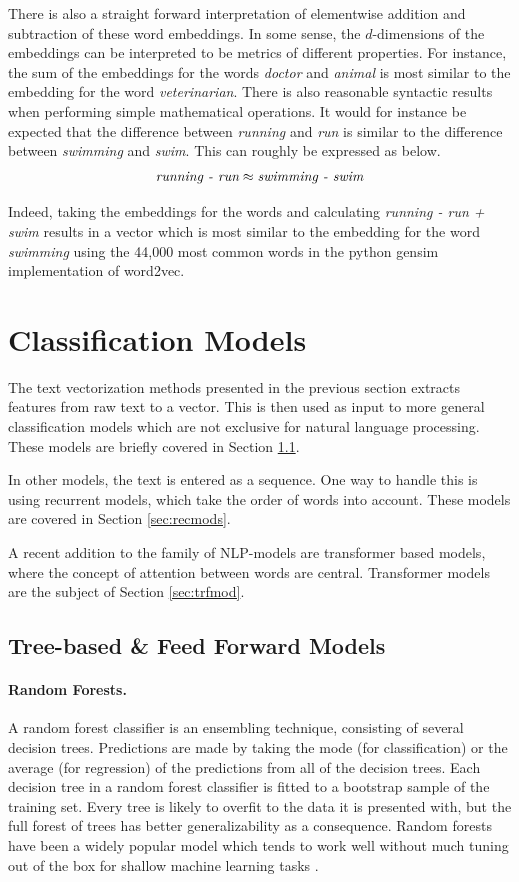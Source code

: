 There is also a straight forward interpretation of elementwise addition and subtraction of these word embeddings. In some sense, the $d$-dimensions of the embeddings can be interpreted to be metrics of different properties. For instance, the sum of the embeddings for the words \emph{doctor} and \emph{animal} is most similar to the embedding for the word \textit{veterinarian}. There is also reasonable syntactic results when performing simple mathematical operations. It would for instance be expected that the difference between \emph{running} and \emph{run} is similar to the difference between \emph{swimming} and \emph{swim}. This can roughly be expressed as below. 
\begin{align}
    \emph{running - run} \approx  \emph{swimming - swim}
\end{align}

Indeed, taking the embeddings for the words and calculating \emph{running - run + swim} results in a vector which is most similar to the embedding for the word \emph{swimming} using the 44,000 most common words in the python gensim implementation of word2vec.


\section{Classification Models}

The text vectorization methods presented in the previous section extracts features from raw text to a vector. This is then used as input to more general classification models which are not exclusive for natural language processing. These models are briefly covered in Section \ref{sec:treeff}. 

In other models, the text is entered as a sequence. One way to handle this is using recurrent models, which take the order of words into account. These models are covered in Section \ref{sec:recmods}. 

A recent addition to the family of NLP-models are transformer based models, where the concept of attention between words are central. Transformer models are the subject of Section \ref{sec:trfmod}.

\subsection{Tree-based \& Feed Forward Models}\label{sec:treeff} 

\paragraph{Random Forests.}
A random forest classifier is an ensembling technique, consisting of several decision trees. Predictions are made by taking the mode (for classification) or the average (for regression) of the predictions from all of the decision trees. Each decision tree in a random forest classifier is fitted to a bootstrap sample of the training set. Every tree is likely to overfit to the data it is presented with, but the full forest of trees has better generalizability as a consequence. Random forests have been a widely popular model which tends to work well without much tuning out of the box for shallow machine learning tasks \citep{chollet2017deep}. 

